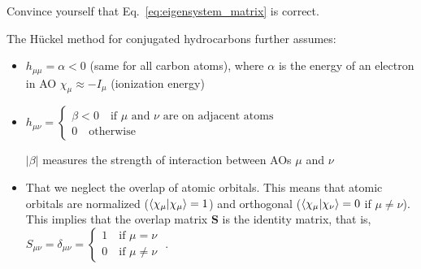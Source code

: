 \documentclass[../Main/chem532-notes.tex]{subfiles}
\begin{document}
\begin{problem}	
Convince yourself that Eq.~\ref{eq:eigensystem_matrix} is correct.
\end{problem}

The H\"{u}ckel method for conjugated hydrocarbons further assumes:
\begin{itemize}
\item $h_{\mu\mu} = \alpha < 0$ (same for all carbon atoms), where $\alpha$ is the energy of an electron in AO $\chi_\mu \approx - I_{\mu}$  (ionization energy)
\item $h_{\mu\nu} =
\begin{cases} \beta < 0 \quad \text{if $\mu$ and $\nu$ are on adjacent atoms}\\
0 \quad \text{otherwise}
\end{cases}$

$|\beta|$ measures the strength of interaction between AOs $\mu$ and $\nu$

\item That we neglect the overlap of atomic orbitals. This means that atomic orbitals are normalized ($\braket{\chi_\mu | \chi_\mu} = 1$) and orthogonal ($\braket{\chi_\mu | \chi_\nu} = 0$ if $\mu \neq \nu$).
This implies that the overlap matrix $\mathbf{S}$ is the identity matrix, that is, $S_{\mu\nu} = \delta_{\mu\nu} = \begin{cases}1 \quad \text{if } \mu = \nu\\
0 \quad \text{if } \mu \neq \nu
\end{cases}$ .
\end{itemize}
\end{document}
